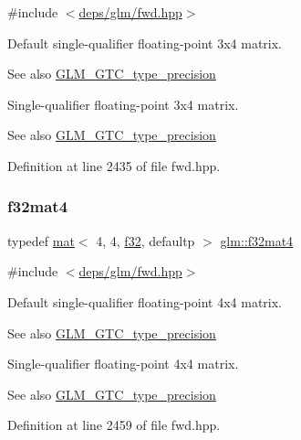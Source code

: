 {\ttfamily \#include $<$\hyperlink{fwd_8hpp}{deps/glm/fwd.\+hpp}$>$}

Default single-\/qualifier floating-\/point 3x4 matrix. \begin{DoxySeeAlso}{See also}
\hyperlink{group__gtc__type__precision}{G\+L\+M\+\_\+\+G\+T\+C\+\_\+type\+\_\+precision}
\end{DoxySeeAlso}
Single-\/qualifier floating-\/point 3x4 matrix. \begin{DoxySeeAlso}{See also}
\hyperlink{group__gtc__type__precision}{G\+L\+M\+\_\+\+G\+T\+C\+\_\+type\+\_\+precision} 
\end{DoxySeeAlso}


Definition at line 2435 of file fwd.\+hpp.

\mbox{\label{group__gtc__type__precision_ga4f0717d91e376ba76e675324dbe21576}} 
\subsubsection{\texorpdfstring{f32mat4}{f32mat4}}
{\footnotesize\ttfamily typedef \hyperlink{structglm_1_1mat}{mat}$<$ 4, 4, \hyperlink{group__gtc__type__precision_ga0ec999b57f5330d9021256e96038df04}{f32}, defaultp $>$ \hyperlink{group__gtc__type__precision_ga4f0717d91e376ba76e675324dbe21576}{glm\+::f32mat4}}



{\ttfamily \#include $<$\hyperlink{fwd_8hpp}{deps/glm/fwd.\+hpp}$>$}

Default single-\/qualifier floating-\/point 4x4 matrix. \begin{DoxySeeAlso}{See also}
\hyperlink{group__gtc__type__precision}{G\+L\+M\+\_\+\+G\+T\+C\+\_\+type\+\_\+precision}
\end{DoxySeeAlso}
Single-\/qualifier floating-\/point 4x4 matrix. \begin{DoxySeeAlso}{See also}
\hyperlink{group__gtc__type__precision}{G\+L\+M\+\_\+\+G\+T\+C\+\_\+type\+\_\+precision} 
\end{DoxySeeAlso}


Definition at line 2459 of file fwd.\+hpp.

\mbox{\label{group__gtc__type__precision_gab0498cc84bb77002f41630e3cd0be87b}} 
